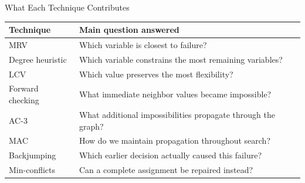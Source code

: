 \documentclass[aspectratio=169,10pt]{beamer}
\begin{document}
\begin{frame}[shrink=20]{What Each Technique Contributes}
  \begin{center}
  \renewcommand{\arraystretch}{1.30}
  \begin{tabular}{l|l}
    \textbf{Technique} & \textbf{Main question answered} \\\hline
    MRV & Which variable is closest to failure? \\
    Degree heuristic & Which variable constrains the most remaining variables? \\
    LCV & Which value preserves the most flexibility? \\
    Forward checking & What immediate neighbor values became impossible? \\
    AC-3 & What additional impossibilities propagate through the graph? \\
    MAC & How do we maintain propagation throughout search? \\
    Backjumping & Which earlier decision actually caused this failure? \\
    Min-conflicts & Can a complete assignment be repaired instead?
  \end{tabular}
  \end{center}
\end{frame}
\end{document}
